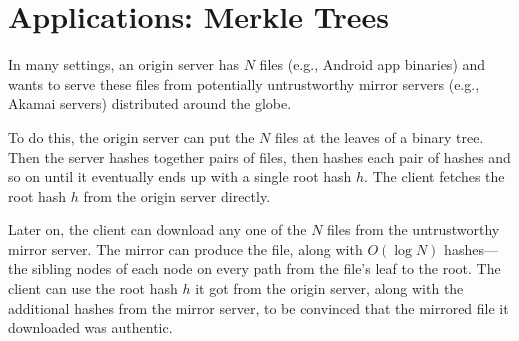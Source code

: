 \section{Applications: Merkle Trees}
In many settings, an origin server has $N$ files (e.g., Android app binaries)
and wants to serve these files from potentially untrustworthy mirror servers
(e.g., Akamai servers) distributed around the globe.

To do this, the origin server can put the $N$ files at the leaves of a
binary tree.
Then the server hashes together pairs of files, then hashes each pair of
hashes and so on until it eventually ends up with
a single root hash $h$.
The client fetches the root hash $h$ from the origin
server directly.

Later on, the client can download any one of the $N$
files from the untrustworthy mirror server.
The mirror can produce the file, along
with $O(\log N)$ hashes---the sibling
nodes of each node on every path from the file's
leaf to the root.
The client can use the root hash $h$ it got from
the origin server, along with the additional hashes
from the mirror server, to be convinced that the mirrored
file it downloaded was authentic.


